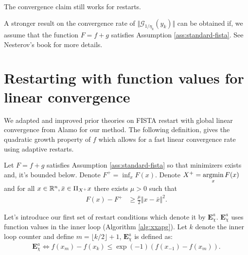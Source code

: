 \documentclass[12pt]{report}
\begin{document}
        \begin{remark}
            The convergence claim still works for restarts. 
        \end{remark}
        \par
        A stronger result on the convergence rate of $\Vert \mathcal G_{1/\eta_k}(y_k)\Vert$ can be obtained if, we assume that the function $F=f + g$ satisfies Assumption \ref{ass:standard-fista}. 
        See Nesterov's book \cite{nesterov_lectures_2018} for more details. 
    
    \section{Restarting with function values for linear convergence}
        We adapted and improved prior theories on FISTA restart with global linear convergence from Alamo \cite{alamo_restart_2019} for our \XXAPG{} method. 
        The following definition, gives the quadratic growth property of $f$ which allows for a fast linear convergence rate using adaptive restarts. 
        \begin{assumption}\label{ass:q-growth-ch2}
            Let $F = f + g$ satisfies Assumption \ref{ass:standard-fista} so that minimizers exists and, it's bounded below. 
            Denote $F^+ = \inf_{x} F(x)$. 
            Denote $X^+ = \mathop{\rm argmin}\limits_{x} F(x)$ and for all $x \in \mathbb R^n, \bar x \in \Pi_{X^+}x$ there exists $\mu > 0$ such that 
            \begin{align*}
                F(x) - F^+ &\ge \frac{\mu}{2}\Vert x - \bar x\Vert^2. 
            \end{align*}
        \end{assumption}
        \par
        Let's introduce our first set of restart conditions which denote it by $\mathbf E_{\chi}^{a}$. 
        $\mathbf E_{\chi}^{a}$ uses function values in the inner loop (Algorithm \ref{alg:xxapg}). 
        Let $k$ denote the inner loop counter and define $m = \lfloor k/2 \rfloor + 1$, $\mathbf E_{\chi}^a$ is defined as: 
        \begin{align}\label{ineq:rxxapg-exit-cond}
            \mathbf E_{\chi}^a \iff 
            f(x_m) - f(x_k) \le \exp(-1)(f(x_{-1}) - f(x_m)). 
        \end{align}
\end{document}
